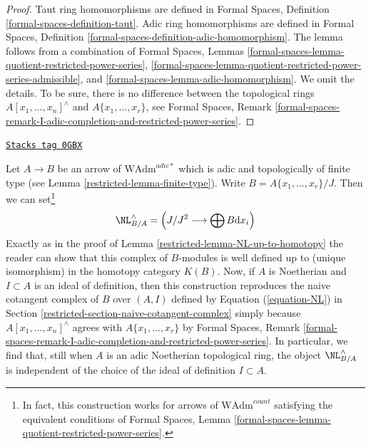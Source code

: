 \begin{proof}
Taut ring homomorphisms are defined in
Formal Spaces, Definition \ref{formal-spaces-definition-taut}.
Adic ring homomorphisms are defined in
Formal Spaces, Definition
\ref{formal-spaces-definition-adic-homomorphism}.
The lemma follows from a combination of
Formal Spaces, Lemmas
\ref{formal-spaces-lemma-quotient-restricted-power-series},
\ref{formal-spaces-lemma-quotient-restricted-power-series-admissible}, and
\ref{formal-spaces-lemma-adic-homomorphism}. We omit the details.
To be sure, there is no difference between the topological rings
$A[x_1, \ldots, x_n]^\wedge$ and $A\{x_1, \ldots, x_r\}$, see
Formal Spaces, Remark
\ref{formal-spaces-remark-I-adic-completion-and-restricted-power-series}.
\end{proof}

\begin{remark}
\label{restricted-remark-NL-well-defined-topological}
\href{https://stacks.math.columbia.edu/tag/0GBX}{\texttt{Stacks tag 0GBX}}

Let $A \to B$ be an arrow of $\text{WAdm}^{adic*}$ which is adic and
topologically of finite type (see Lemma \ref{restricted-lemma-finite-type}). Write
$B = A\{x_1, \ldots, x_r\}/J$. Then we can set\footnote{In fact, this
construction works for arrows of $\text{WAdm}^{count}$ satisfying the
equivalent conditions of Formal Spaces, Lemma
\ref{formal-spaces-lemma-quotient-restricted-power-series}.}
$$
\NL_{B/A}^\wedge = \left(J/J^2 \longrightarrow \bigoplus B\text{d}x_i\right)
$$
Exactly as in the proof of Lemma \ref{restricted-lemma-NL-up-to-homotopy}
the reader can show that this complex of $B$-modules is
well defined up to (unique isomorphism) in the homotopy category $K(B)$.
Now, if $A$ is Noetherian and $I \subset A$ is an ideal of definition,
then this construction reproduces the naive cotangent complex
of $B$ over $(A, I)$ defined by Equation (\ref{equation-NL})
in Section \ref{restricted-section-naive-cotangent-complex} simply because
$A[x_1, \ldots, x_n]^\wedge$ agrees with $A\{x_1, \ldots, x_r\}$ by
Formal Spaces, Remark
\ref{formal-spaces-remark-I-adic-completion-and-restricted-power-series}.
In particular, we find that, still when $A$ is an adic Noetherian
topological ring, the object $\NL_{B/A}^\wedge$ is independent
of the choice of the ideal of definition $I \subset A$.
\end{remark}

